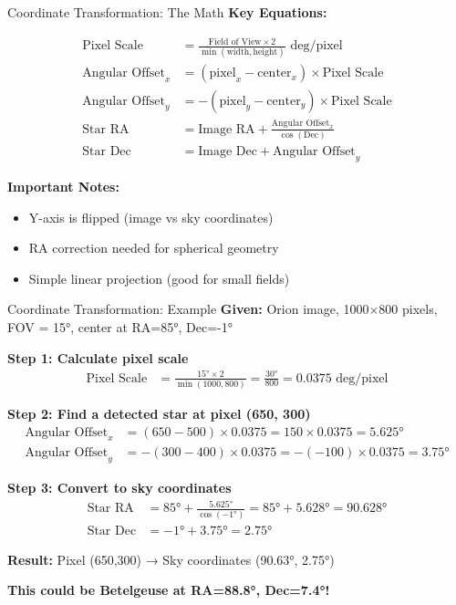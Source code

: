 \documentclass[aspectratio=169]{beamer}
\begin{document}
\begin{frame}{Coordinate Transformation: The Math}
\textbf{Key Equations:}

\begin{align}
\text{Pixel Scale} &= \frac{\text{Field of View} \times 2}{\min(\text{width}, \text{height})} \text{ deg/pixel} \\[0.3cm]
\text{Angular Offset}_x &= (\text{pixel}_x - \text{center}_x) \times \text{Pixel Scale} \\[0.3cm]
\text{Angular Offset}_y &= -(\text{pixel}_y - \text{center}_y) \times \text{Pixel Scale} \\[0.3cm]
\text{Star RA} &= \text{Image RA} + \frac{\text{Angular Offset}_x}{\cos(\text{Dec})} \\[0.3cm]
\text{Star Dec} &= \text{Image Dec} + \text{Angular Offset}_y
\end{align}

\vspace{0.3cm}
\textbf{Important Notes:}
\begin{itemize}
\item Y-axis is flipped (image vs sky coordinates)
\item RA correction needed for spherical geometry
\item Simple linear projection (good for small fields)
\end{itemize}
\end{frame}

\begin{frame}{Coordinate Transformation: Example}
\textbf{Given:} Orion image, 1000×800 pixels, FOV = 15°, center at RA=85°, Dec=-1°

\textbf{Step 1: Calculate pixel scale}
\begin{align}
\text{Pixel Scale} &= \frac{15° \times 2}{\min(1000, 800)} = \frac{30°}{800} = 0.0375 \text{ deg/pixel}
\end{align}

\textbf{Step 2: Find a detected star at pixel (650, 300)}
\begin{align}
\text{Angular Offset}_x &= (650 - 500) \times 0.0375 = 150 \times 0.0375 = 5.625° \\
\text{Angular Offset}_y &= -(300 - 400) \times 0.0375 = -(-100) \times 0.0375 = 3.75°
\end{align}

\textbf{Step 3: Convert to sky coordinates}
\begin{align}
\text{Star RA} &= 85° + \frac{5.625°}{\cos(-1°)} = 85° + 5.628° = 90.628° \\
\text{Star Dec} &= -1° + 3.75° = 2.75°
\end{align}

\textcolor{stargreen}{\textbf{Result:} Pixel (650,300) → Sky coordinates (90.63°, 2.75°)}

\textcolor{starblue}{\textbf{This could be Betelgeuse at RA=88.8°, Dec=7.4°!}}
\end{frame}
\end{document}
